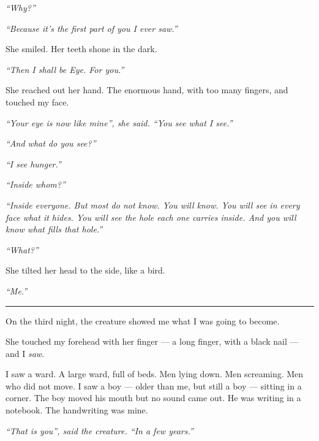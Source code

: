 \noindent \textit{\textquotedblleft{}Why?\textquotedblright{}}

\noindent \textit{\textquotedblleft{}Because it's the first part of you I ever saw.\textquotedblright{}}

\noindent She smiled. Her teeth shone in the dark.

\noindent \textit{\textquotedblleft{}Then I shall be Eye. For you.\textquotedblright{}}

\noindent She reached out her hand. The enormous hand, with too many fingers, and touched my face.

\noindent \textit{\textquotedblleft{}Your eye is now like mine\textquotedblright{}\textit{, she said. }\textquotedblleft{}You see what I see.\textquotedblright{}}

\noindent \textit{\textquotedblleft{}And what do you see?\textquotedblright{}}

\noindent \textit{\textquotedblleft{}I see hunger.\textquotedblright{}}

\noindent \textit{\textquotedblleft{}Inside whom?\textquotedblright{}}

\noindent \textit{\textquotedblleft{}Inside everyone. But most do not know. You will know. You will see in every face what it hides. You will see the hole each one carries inside. And you will know what fills that hole.\textquotedblright{}}

\noindent \textit{\textquotedblleft{}What?\textquotedblright{}}

\noindent She tilted her head to the side, like a bird.

\noindent \textit{\textquotedblleft{}Me.\textquotedblright{}}

\vspace{0.5em}\noindent\rule{\textwidth}{0.5pt}\vspace{0.5em}

\noindent On the third night, the creature showed me what I was going to become.

\noindent She touched my forehead with her finger --- a long finger, with a black nail --- and I \textit{saw}.

\noindent I saw a ward. A large ward, full of beds. Men lying down. Men screaming. Men who did not move. I saw a boy --- older than me, but still a boy --- sitting in a corner. The boy moved his mouth but no sound came out. He was writing in a notebook. The handwriting was mine.

\noindent \textit{\textquotedblleft{}That is you\textquotedblright{}\textit{, said the creature. }\textquotedblleft{}In a few years.\textquotedblright{}}


